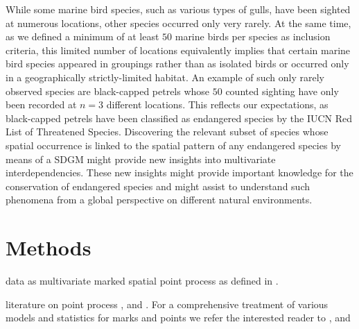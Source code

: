 \documentclass{statsoc}
\begin{document}
While some marine bird species, such as various types of gulls, have been sighted at numerous locations, other species occurred only very rarely. At the same time, as we defined a minimum of at least $50$ marine birds per species as inclusion criteria, this limited number of locations equivalently implies that certain marine bird species appeared in groupings rather than as isolated birds or occurred only in a geographically strictly-limited habitat. An example of such only rarely observed species are black-capped petrels whose $50$ counted sighting have only been recorded at $n=3$ different locations. This reflects our expectations, as black-capped petrels have been classified as endangered species by the IUCN Red List of Threatened Species. Discovering the relevant subset of species whose spatial occurrence is linked to the spatial pattern of any endangered species  by means of a SDGM might provide new insights into multivariate interdependencies.  These new insights might provide important knowledge for the conservation of endangered species and might assist to understand such phenomena from a global perspective on different natural environments.    



\section{Methods}

data as multivariate marked spatial point process as defined in \cite{Eckardt2016b}. 

literature on point process
\cite{Chiu2013}, \cite{Illian2008} and \cite{StoyanStoyan1994}.
For a comprehensive treatment of various models and statistics for marks and points we refer the interested reader to \cite{Illian2008}, \cite{Baddeley2010} and \cite{WiegandMoloney2013}
\end{document}
